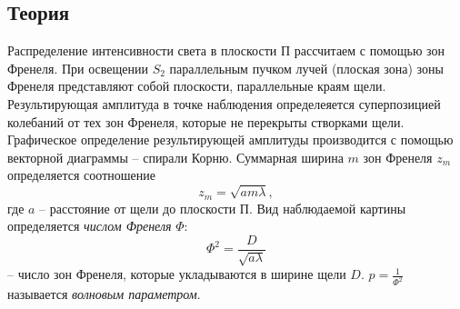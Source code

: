 \documentclass[a4paper, 12pt]{article}%
\begin{document}
\subsection*{Теория}
Распределение интенсивности света в плоскости П рассчитаем с помощью зон Френеля. При освещении $S_2$ параллельным пучком лучей (плоская зона) зоны Френеля представляют собой плоскости, параллельные краям щели. Результирующая амплитуда в точке наблюдения определеяется суперпозицией колебаний от тех зон Френеля, которые не перекрыты створками щели. Графическое определение результирующей амплитуды производится с помощью векторной диаграммы -- спирали Корню. Суммарная ширина $m$ зон Френеля $z_m$ определяется соотношение
\begin{equation}
z_m = \sqrt{am\lambda},
\end{equation}
где $a$ -- расстояние от щели до плоскости П. Вид наблюдаемой картины определяется \textit{числом Френеля} $\Phi$:
$$
\Phi^2 = \dfrac{D}{\sqrt{a\lambda}}
$$
-- число зон Френеля, которые укладываются в ширине щели $D$. $p = \frac{1}{\Phi^2}$ называется \textit{волновым параметром}.
\end{document}
